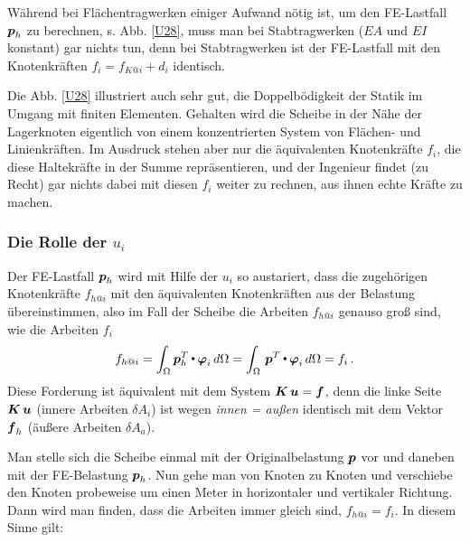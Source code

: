 W\"{a}hrend bei Fl\"{a}chentragwerken einiger Aufwand n\"{o}tig ist, um den FE-Lastfall $\mbox{\boldmath $p$}_h$ zu berechnen, s. Abb. \ref{U28}, muss man bei Stabtragwerken ($EA$ und $EI$ konstant) gar nichts tun, denn bei Stabtragwerken ist der FE-Lastfall mit den Knotenkr\"{a}ften $f_i = f_{K @ i} + d_i$ identisch.\\

\begin{remark}
Die Abb. \ref{U28} illustriert auch sehr gut, die \glq Doppelb\"{o}digkeit\grq{} der Statik im Umgang mit finiten Elementen. Gehalten wird die Scheibe in der N\"{a}he der Lagerknoten eigentlich von einem konzentrierten System von Fl\"{a}chen- und Linienkr\"{a}ften. Im Ausdruck stehen aber nur die \"{a}quivalenten Knotenkr\"{a}fte $f_i$, die diese Haltekr\"{a}fte in der \glq Summe\grq{} repr\"{a}sentieren, und der Ingenieur findet (zu Recht) gar nichts dabei mit diesen $f_i$ weiter zu rechnen, aus ihnen echte Kr\"{a}fte zu machen.
\end{remark}
\vspace{-0.5cm}
{\textcolor{sectionTitleBlue}{\subsubsection*{Die Rolle der $u_i$}}}

Der FE-Lastfall $\mbox{\boldmath $p$}_h$ wird mit Hilfe der $u_i$ so austariert, dass die zugeh\"{o}rigen Knotenkr\"{a}fte $f_{h @i}$ mit den \"{a}quivalenten Knotenkr\"{a}ften aus der Belastung \"{u}bereinstimmen, also im Fall der Scheibe die Arbeiten $f_{h @i}$ genauso gro{\ss} sind, wie die Arbeiten $f_i$
\begin{align}\label{Eq123}
f_{h @i} = \int_{\Omega} \mbox{\boldmath $p$}_h^T {\,\scriptscriptstyle \stackrel{\bullet}{{}}}\, \mbox{\boldmath $\varphi$}_i\,d\Omega = \int_{\Omega}\,\mbox{\boldmath $p$}^T {\,\scriptscriptstyle \stackrel{\bullet}{{}}}\, \mbox{\boldmath $\varphi$}_i\,d\Omega = f_i\,.
\end{align}
Diese Forderung ist \"{a}quivalent mit dem System $\mbox{\boldmath $K$}\,\mbox{\boldmath $u$} = \mbox{\boldmath $f$}$, denn die linke Seite $\mbox{\boldmath $K$}\,\mbox{\boldmath $u$}$ (innere Arbeiten $\delta A_i$) ist wegen {\em \glq innen = au{\ss}en\grq{}\/} identisch mit dem Vektor $\mbox{\boldmath $f$}_h$ (\"{a}u{\ss}ere Arbeiten $\delta A_a$).

Man stelle sich die Scheibe einmal mit der Originalbelastung $\mbox{\boldmath $p$}$ vor und daneben mit der FE-Belastung $\mbox{\boldmath $p$}_h$. Nun gehe man von Knoten zu Knoten und verschiebe den Knoten probeweise um einen Meter in horizontaler und vertikaler Richtung. Dann wird man finden, dass die Arbeiten immer gleich sind, $f_{h @i} = f_i$. In diesem Sinne gilt:\\


